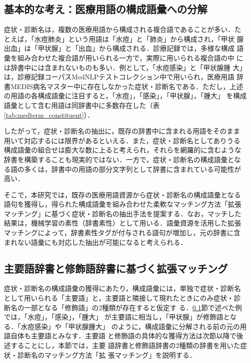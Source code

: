 \documentclass[japanese]{jnlp_1.4}
\begin{document}
\subsection{基本的な考え：医療用語の構成語彙への分解}
\label{sec:basic_idea}

症状・診断名は，複数の医療用語から構成される複合語であることが多い．た
とえば，「水痘肺炎」という用語は「水痘」と「肺炎」から構成され，「甲状
腺出血」は「甲状腺」と「出血」から構成される．診療記録では，多様な構成
語彙を組み合わせた複合語が用いられる一方で，実際に用いられる複合語の中
には辞書中には含まれないものも多い．例として，「水痘感染」と「甲状腺腫
大」は，診療記録コーパスMedNLPテストコレクション中で用いられ，医療用語
辞書MEDIS病名マスター中に存在しなかった症状・診断名である．ただし，上述
の用語の各構成語彙に注目すると，「水痘」，「感染」，「甲状腺」，「腫大」
を構成語彙として含む用語は同辞書中に多数存在した（表\ref{tab:medterm_constituent}）．

\begin{table}[t]
 \label{tab:medterm_constituent}

\end{table}

したがって，症状・診断名の抽出に，既存の辞書中に含まれる用語をそのまま
用いて対応するには限界があるといえる．また，症状・診断名としてありうる
構成語彙の組合せは膨大な数に上ると考えられ，それらを網羅的に含むような
辞書を構築することも現実的ではない．一方で，症状・診断名の構成語彙とな
る語の多くは，辞書中の用語の部分文字列として辞書に含まれている可能性が
高い．

そこで，本研究では，既存の医療用語資源から症状・診断名の構成語彙となる
語句を獲得し，得られた構成語彙を組み合わせた柔軟なマッチング方法「拡張
マッチング」に基づく症状・診断名の抽出手法を提案する．なお，マッチした
結果は，機械学習の素性（辞書素性）として用いる．語彙資源を活用した拡張
マッチングによって，辞書素性タグが付与される語句が増加し，元の辞書に含
まれない語彙にも対応した抽出が可能になると考えられる．


\subsection{主要語辞書と修飾語辞書に基づく拡張マッチング}
\label{sec:ext_match}

症状・診断名の構成語彙の獲得にあたり，構成語彙には，単独で症状・診断名
として用いられる「主要語」と，主要語と隣接して現れたときにのみ症状・診
断名の一部となる「修飾語」の2種類が存在すると仮定す
る．\ref{sec:basic_idea}節で述べた例では，「水痘」，「感染」，「腫大」
が主要語に相当し，「甲状腺」が修飾語となる．「水痘感染」や「甲状腺腫大」
のように，構成語彙に分解される前の元の用語自体も主要語とみなす．主要語
と修飾語の具体的な獲得方法は次節以降で後述することにし，本節では，主要
語辞書と修飾語辞書の2種類の辞書を用いた症状・診断名のマッチング方法「拡
張マッチング」を説明する．
\end{document}
